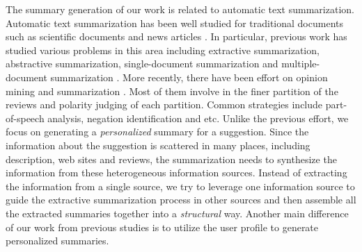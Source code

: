 The summary generation of our work is related to automatic text 
summarization. 
Automatic text summarization has been well studied for traditional 
documents such as scientific documents and news articles \cite{Radev:02}. 
In particular, previous work has studied various problems in this 
area including extractive summarization, abstractive summarization, 
single-document summarization and multiple-document summarization \cite{Das:07}. 
More recently, there have been effort on opinion mining and 
summarization \cite{Pang:2008:OMS:1454711.1454712,
Pak10, Pang:2004:SES:1218955.1218990,
mani1999advances,mani2001automatic,knight2002summarization,
ding2007utility,BACCIANELLA10.769,Chen:2010:AOM:1829879.1829923,
dey2009opinion,journals/sigir/Esuli08}. Most of them involve in the 
finer partition of the reviews and polarity judging of each partition. 
Common strategies include part-of-speech analysis, negation 
identification and etc. 
Unlike the previous effort, we focus on generating a 
{\em personalized} summary for a suggestion. 
Since the information about the suggestion is scattered in 
many places, including description, web sites 
and reviews, the summarization needs to synthesize the information 
from these heterogeneous information sources. Instead of 
extracting the information from a single source, we try to 
leverage one information source to guide the extractive 
summarization process in other sources and then assemble
all the extracted summaries together into a {\em structural} way.  
Another main difference of our work from previous studies is to 
utilize the user profile to generate personalized summaries.  
